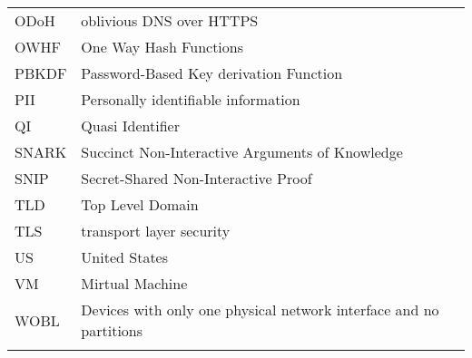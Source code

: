 \begin{table}
\begin{tabular}{ll}
ODoH &  oblivious DNS over HTTPS\\                                                  
OWHF &  One Way Hash Functions\\                                                    
PBKDF & Password-Based Key derivation Function\\                                    
PII & Personally identifiable information\\                                      
QI &    Quasi Identifier\\                                                          
SNARK & Succinct Non-Interactive Arguments of Knowledge\\                           
SNIP &  Secret-Shared Non-Interactive Proof\\                                       
TLD & Top Level Domain\\                                                            
TLS & transport layer security\\                                                    
US &    United States\\                                                               
VM &    Mirtual Machine\\                                                        
WOBL &  Devices with only one physical network interface and no  partitions\\
&  
\end{tabular}
\end{table}